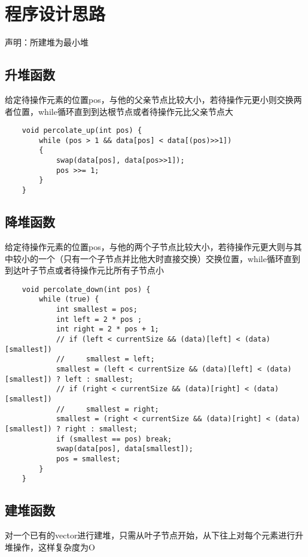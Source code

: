 \documentclass[UTF8]{ctexart}
\begin{document}
\pagestyle{fancy}
\fancyhead{}
\rhead{\today}

\section{程序设计思路}
声明：所建堆为最小堆

\subsection{升堆函数}
给定待操作元素的位置pos，与他的父亲节点比较大小，若待操作元更小则交换两者位置，while循环直到到达根节点或者待操作元比父亲节点大

\begin{lstlisting}
    void percolate_up(int pos) {
        while (pos > 1 && data[pos] < data[(pos)>>1])
        {
            swap(data[pos], data[pos>>1]);
            pos >>= 1;
        }
    }
\end{lstlisting}

\subsection{降堆函数}
给定待操作元素的位置pos，与他的两个子节点比较大小，若待操作元更大则与其中较小的一个（只有一个子节点并比他大时直接交换）交换位置，while循环直到到达叶子节点或者待操作元比所有子节点小

\begin{lstlisting}
    void percolate_down(int pos) {
        while (true) {
            int smallest = pos;
            int left = 2 * pos ;
            int right = 2 * pos + 1;
            // if (left < currentSize && (data)[left] < (data)[smallest])
            //     smallest = left;
            smallest = (left < currentSize && (data)[left] < (data)[smallest]) ? left : smallest;
            // if (right < currentSize && (data)[right] < (data)[smallest])
            //     smallest = right;
            smallest = (right < currentSize && (data)[right] < (data)[smallest]) ? right : smallest;
            if (smallest == pos) break;
            swap(data[pos], data[smallest]);
            pos = smallest;
        }   
    }

\end{lstlisting}

\subsection{建堆函数}
对一个已有的vector进行建堆，只需从叶子节点开始，从下往上对每个元素进行升堆操作，这样复杂度为O
\end{document}
